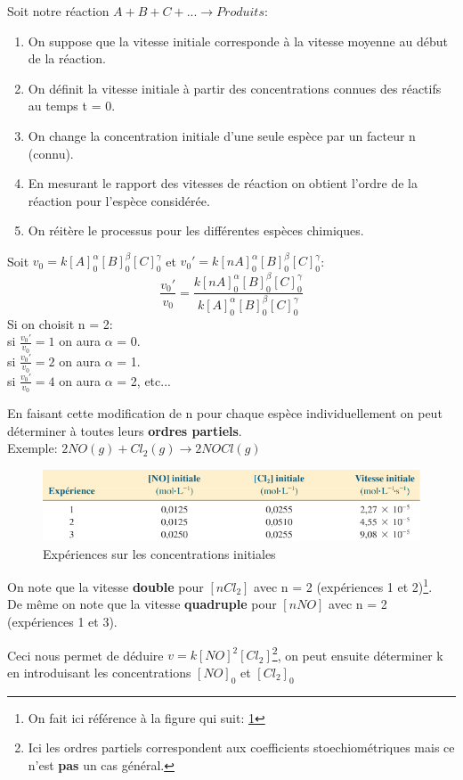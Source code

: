 \documentclass[10pt,a4paper]{book}
\begin{document}
Soit notre réaction \(A + B + C + ... \rightarrow Produits\):
\begin{enumerate}
\item On suppose que la vitesse initiale corresponde à la vitesse moyenne au début de la réaction.
\item On définit la vitesse initiale à partir des concentrations connues des réactifs au temps t = 0.
\item On change la concentration initiale d'une seule espèce par un facteur n (connu).
\item En mesurant le rapport des vitesses de réaction on obtient l'ordre de la réaction pour l'espèce considérée.
\item On réitère le processus pour les différentes espèces chimiques.
\end{enumerate}
Soit \(v_0 = k[A]^{\alpha}_0[B]^{\beta}_0[C]^{\gamma}_0\) et \(v_0' = k[nA]^{\alpha}_0[B]^{\beta}_0[C]^{\gamma}_0\):
\[\frac{v_0'}{v_0} = \frac{k[nA]^{\alpha}_0[B]^{\beta}_0[C]^{\gamma}_0}{k[A]^{\alpha}_0[B]^{\beta}_0[C]^{\gamma}_0}\]
Si on choisit n = 2: \\
si \(\frac{v_0'}{v_0} = 1\) on aura $\alpha$ = 0. \\
si \(\frac{v_0'}{v_0} = 2\) on aura $\alpha$ = 1. \\
si \(\frac{v_0'}{v_0} = 4\) on aura $\alpha$ = 2, etc... \par
En faisant cette modification de n pour chaque espèce individuellement on peut déterminer à toutes leurs \textbf{ordres partiels}.
\\
Exemple: \(2NO(g) + Cl_2(g) \longrightarrow 2NOCl(g)\) \\
\begin{figure}[h!]
\begin{center}
\includegraphics[scale=0.75]{./assets/method_vitesse_exemple.png}
\caption{Expériences sur les concentrations initiales}
\label{fig:speed_method_example}
\end{center}
\end{figure}
On note que la vitesse \textbf{double} pour \([nCl_2]\) avec n = 2 (expériences 1 et 2)\footnote{On fait ici référence à la figure qui suit: \ref{fig:speed_method_example}}. \\
De même on note que la vitesse \textbf{quadruple} pour \([nNO]\) avec n = 2 (expériences 1 et 3). \par
Ceci nous permet de déduire \(v = k[NO]^2[Cl_2]\)\;\;\footnote{Ici les ordres partiels correspondent aux coefficients stoechiométriques mais ce n'est \textbf{pas} un cas général.}, on peut ensuite déterminer k en introduisant les concentrations $[NO]_0$ et $[Cl_2]_0$ 
\end{document}
